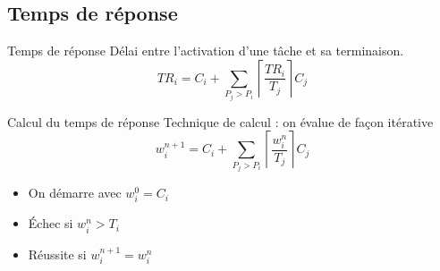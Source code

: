 \subsection{Temps de réponse}

\begin{frame}{Temps de réponse}
  Délai entre l'activation d'une tâche et sa terminaison.
  $$TR_i = C_i + \sum_{P_j > P_i} \left\lceil\frac{TR_i}{T_j}\right\rceil C_j$$
\end{frame}

\begin{frame}{Calcul du temps de réponse}
  Technique de calcul : on évalue de façon itérative
  $$w_i^{n+1}=C_i+\sum_{P_j > P_i} \left\lceil\frac{w_i^n}{T_j}\right\rceil C_j$$

  \begin{itemize}
    \item On démarre avec $w_i^0 = C_i$
    \item Échec si $w_i^n > T_i$
    \item Réussite si $w_i^{n+1} = w_i^n$
  \end{itemize}
\end{frame}

